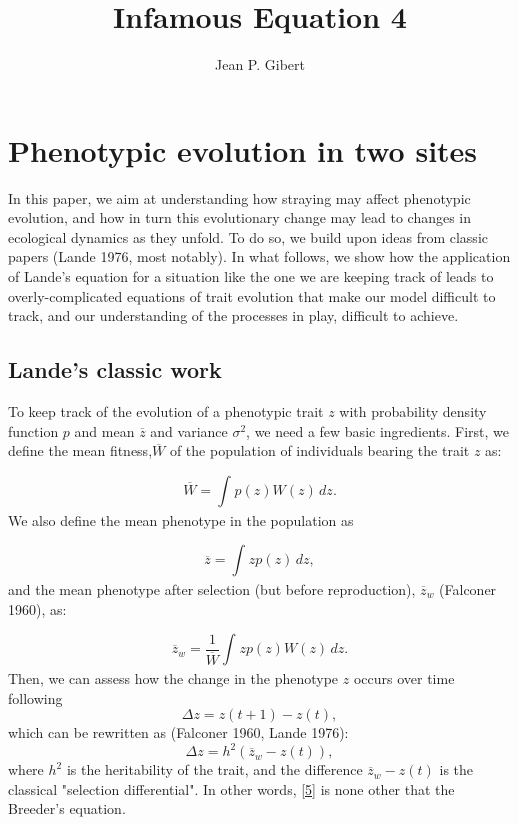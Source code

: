 \documentclass[a4paper]{article}
\title{Infamous Equation 4}
\author{Jean P. Gibert}
\begin{document}
\maketitle

\section{Phenotypic evolution in two sites}
In this paper, we aim at understanding how straying may affect phenotypic evolution, and how in turn this evolutionary change may lead to changes in ecological dynamics as they unfold. To do so, we build upon ideas from classic papers (Lande 1976, most notably). In what follows, we show how the application of Lande's equation for a situation like the one we are keeping track of leads to overly-complicated equations of trait evolution that make our model difficult to track, and our understanding of the processes in play, difficult to achieve. 

\subsection{Lande's classic work}
To keep track of the evolution of a phenotypic trait $z$ with probability density function $p$ and mean $\overline{z}$ and variance $\sigma^{2}$, we need a few basic ingredients. First, we define the mean fitness,$\overline{W}$ of the population of individuals bearing the trait $z$ as:

\begin{equation}\label{1}
\overline{W}=\int_{} p(z)W(z)\,dz.
\end{equation}
We also define the mean phenotype in the population as  

\begin{equation}\label{2}
\overline{z}=\int_{} zp(z)\,dz,
\end{equation}
and the mean phenotype after selection (but before reproduction), $\overline{z}_{w}$ (Falconer 1960), as:

\begin{equation}\label{3}
\overline{z}_{w}=\frac{1}{\overline{W}}\int_{} zp(z)W(z)\,dz.
\end{equation}
Then, we can assess how the change in the phenotype $z$ occurs over time following
\begin{equation}\label{4}
\Delta z=z(t+1)-z(t),
\end{equation}
which can be rewritten as (Falconer 1960, Lande 1976):
\begin{equation}\label{5}
\Delta z=h^{2}(\overline{z}_{w}-z(t)),
\end{equation}
where $h^{2}$ is the heritability of the trait, and the difference $\overline{z}_{w}-z(t)$ is the classical "selection differential". In other words, \ref{5} is none other that the Breeder's equation. 
\end{document}
